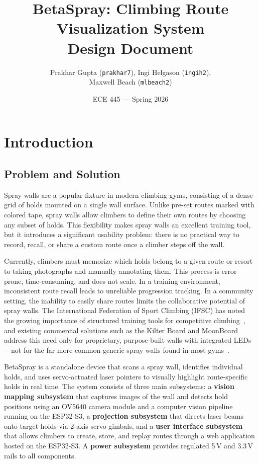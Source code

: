 \documentclass[12pt]{extarticle}
\title{\vspace{-4em} BetaSpray: Climbing Route Visualization System \\ \large Design Document}
\author{Prakhar Gupta (\texttt{prakhar7}), Ingi Helgason (\texttt{ingih2}),\\ Maxwell Beach (\texttt{mlbeach2})}
\date{ECE 445 --- Spring 2026}
\begin{document}
\maketitle
\tableofcontents
\newpage

\section{Introduction}

\subsection{Problem and Solution}

Spray walls are a popular fixture in modern climbing gyms, consisting of a dense grid of holds
mounted on a single wall surface. Unlike pre-set routes marked with colored tape, spray walls
allow climbers to define their own routes by choosing any subset of holds. This flexibility
makes spray walls an excellent training tool, but it introduces a significant usability problem:
there is no practical way to record, recall, or share a custom route once a climber steps off
the wall.

Currently, climbers must memorize which holds belong to a given route or resort to taking
photographs and manually annotating them. This process is error-prone, time-consuming, and does
not scale. In a training environment, inconsistent route recall leads to unreliable progression
tracking. In a community setting, the inability to easily share routes limits the collaborative
potential of spray walls. The International Federation of Sport Climbing (IFSC) has noted the
growing importance of structured training tools for competitive climbing~\cite{ifsc}, and
existing commercial solutions such as the Kilter Board and MoonBoard address this need only for
proprietary, purpose-built walls with integrated LEDs---not for the far more common generic
spray walls found in most gyms~\cite{moonboard}.

BetaSpray is a standalone device that scans a spray wall, identifies individual holds, and uses
servo-actuated laser pointers to visually highlight route-specific holds in real time. The
system consists of three main subsystems: a \textbf{vision mapping subsystem} that captures
images of the wall and detects hold positions using an OV5640 camera module and a computer
vision pipeline running on the ESP32-S3, a \textbf{projection subsystem} that directs laser
beams onto target holds via 2-axis servo gimbals, and a \textbf{user interface subsystem} that
allows climbers to create, store, and replay routes through a web application hosted on the
ESP32-S3. A \textbf{power subsystem} provides regulated 5\,V and 3.3\,V rails to all
components.
\end{document}
